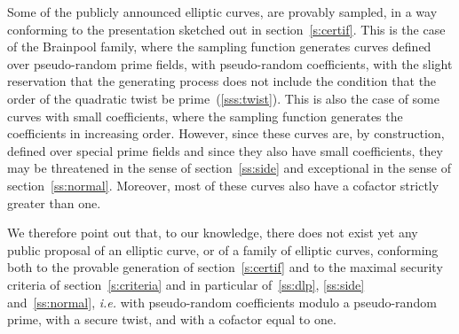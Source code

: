 \documentclass[twocolumn,letterpaper,10pt]{article}
\begin{document}
Some of the publicly announced elliptic curves,
are provably sampled, in a way conforming to the presentation
sketched out in section~\ref{s:certif}.
This is the case of the Brainpool family,
where the sampling function generates
curves defined over pseudo-random prime fields,
with pseudo-random coefficients,
with the slight reservation that the generating process does not include
the condition that the order of the quadratic twist be
prime~(\ref{sss:twist}).
This is also the case of some curves with small coefficients,
where the sampling function generates the coefficients
in increasing order.
However, since these curves are, by construction,
defined over special prime fields
and since they also have small coefficients,
they may be threatened in the sense of section~\ref{ss:side}
and exceptional in the sense of section~\ref{ss:normal}.
Moreover, most of these curves
also have a cofactor strictly greater than one.

\bigbreak

We therefore point out that, to our knowledge,
there does not exist yet any public proposal of an elliptic curve,
or of a family of elliptic curves, conforming both
to the provable generation of section~\ref{s:certif}
and to the maximal security criteria of section~\ref{s:criteria}
and in particular of~\ref{ss:dlp}, \ref{ss:side} and~\ref{ss:normal},
\emph{i.e.} with pseudo-random coefficients
modulo a pseudo-random prime,
with a secure twist,
and with a cofactor equal to one.



\end{document}

